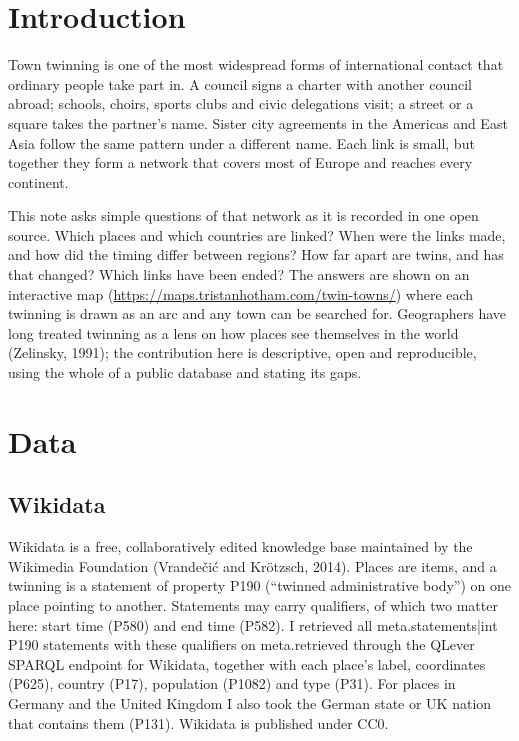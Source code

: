 \documentclass[11pt,a4paper]{article}
\begin{document}
\section{Introduction}

Town twinning is one of the most widespread forms of international contact that ordinary people take part in. A council signs a charter with another council abroad; schools, choirs, sports clubs and civic delegations visit; a street or a square takes the partner's name. Sister city agreements in the Americas and East Asia follow the same pattern under a different name. Each link is small, but together they form a network that covers most of Europe and reaches every continent.

This note asks simple questions of that network as it is recorded in one open source. Which places and which countries are linked? When were the links made, and how did the timing differ between regions? How far apart are twins, and has that changed? Which links have been ended? The answers are shown on an interactive map (\url{https://maps.tristanhotham.com/twin-towns/}) where each twinning is drawn as an arc and any town can be searched for. Geographers have long treated twinning as a lens on how places see themselves in the world (Zelinsky, 1991); the contribution here is descriptive, open and reproducible, using the whole of a public database and stating its gaps.

\section{Data}

\subsection{Wikidata}

Wikidata is a free, collaboratively edited knowledge base maintained by the Wikimedia Foundation (Vrande\v{c}i\'{c} and Kr\"{o}tzsch, 2014). Places are items, and a twinning is a statement of property P190 (``twinned administrative body'') on one place pointing to another. Statements may carry qualifiers, of which two matter here: start time (P580) and end time (P582). I retrieved all {{meta.statements|int}} P190 statements with these qualifiers on {{meta.retrieved}} through the QLever SPARQL endpoint for Wikidata, together with each place's label, coordinates (P625), country (P17), population (P1082) and type (P31). For places in Germany and the United Kingdom I also took the German state or UK nation that contains them (P131). Wikidata is published under CC0.
\end{document}
